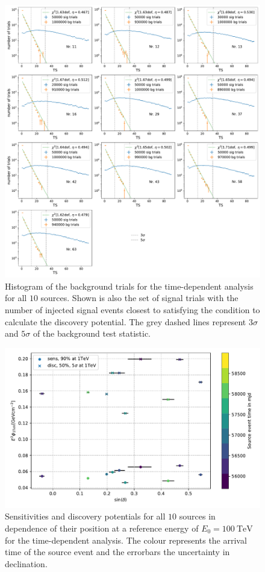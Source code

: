 \begin{figure}
    \centering
    \includegraphics[width=\linewidth]{Plots/appendix/9_years_gfu_gold_time_dep_sig_disc_ts.pdf}
    \caption{Histogram of the background trials for the time-dependent analysis for all $\num{10}$ sources. Shown is also the set of signal trials with the number of injected signal events closest to satisfying the condition to calculate the discovery potential. The grey dashed lines represent $\num{3}\sigma$ and $\num{5}\sigma$ of the background test statistic.}
    \label{fig:time_dep_sig_disc_ts}
\end{figure}

\begin{figure}
    \centering
    \includegraphics[width=\linewidth]{Plots/appendix/time_dep_sens_disc_dec_time_2.pdf}
    \caption{Sensitivities and discovery potentials for all $\num{10}$ sources in dependence of their position at a reference energy of $E_0 = \SI{100}{\tera\electronvolt}$ for the time-dependent analysis. The colour represents the arrival time of the source event and the errorbars the uncertainty in declination.}
    \label{fig:sens_disc_time_dep_dec_2}
\end{figure}

